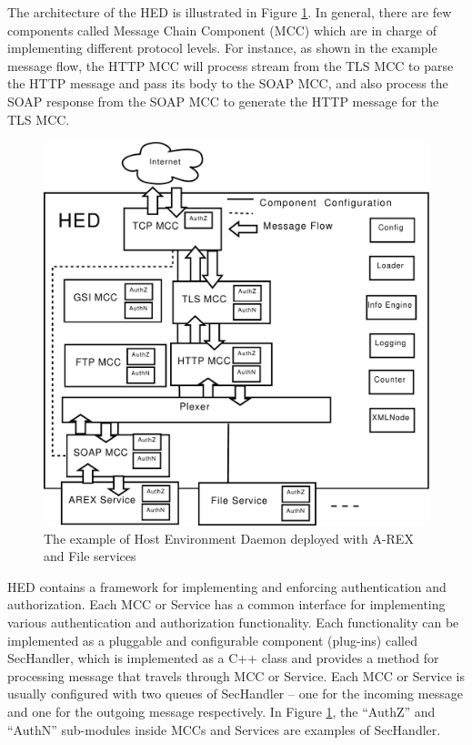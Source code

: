 \documentclass[conference]{IEEEtran}
\begin{document}
The architecture of the HED is illustrated in Figure \ref{fig:HED}. In general, there are few components called Message Chain Component (MCC) which are in charge of implementing different protocol levels. For instance, as shown in the example message flow, the HTTP MCC will process stream from the TLS MCC to parse the HTTP message and pass its body to the SOAP MCC, and also process the SOAP response from the SOAP MCC to generate the HTTP message for the TLS MCC.

\begin{figure}
\includegraphics[width=0.9\columnwidth]{HED.pdf}
\caption{The example of Host Environment Daemon deployed with A-REX and File services}
\label{fig:HED}
\end{figure}
HED contains a framework for implementing and enforcing authentication and authorization. Each MCC or Service has a common interface for implementing various authentication and authorization functionality. Each functionality can be implemented as a pluggable and configurable component (plug-ins) called SecHandler, which is implemented as a C++ class and provides a method for processing message that travels through MCC or Service. Each MCC or Service is usually configured with two queues of SecHandler -- one for the incoming message and one for the outgoing message respectively. In Figure \ref{fig:HED}, the ``AuthZ'' and ``AuthN'' sub-modules inside MCCs and Services are examples of SecHandler.
\end{document}
